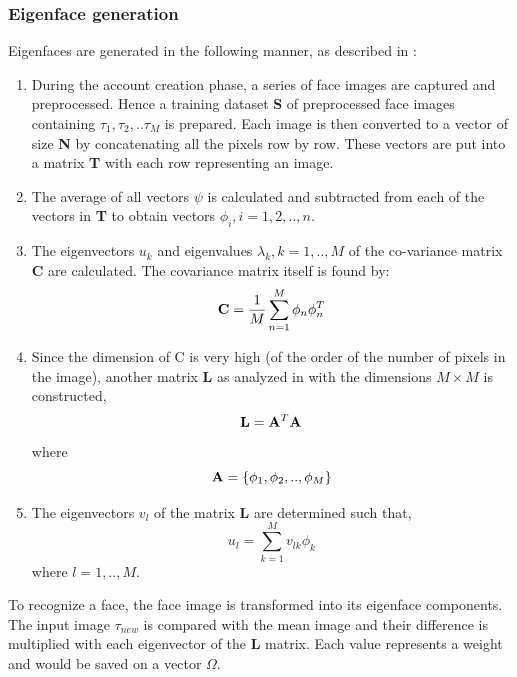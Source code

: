 \documentclass[%
        final,
        notitlepage,
        narroweqnarray,
        inline,
        ]{ieee}
\begin{document}
\subsubsection{ Eigenface generation }
Eigenfaces are generated in the following manner, as described in \cite{Turk91}:
\begin{enumerate}
	\item During the account creation phase, a series of face images are captured and preprocessed. Hence a training dataset {\bf S} of preprocessed face images containing $\tau_{1},\tau_{2},..\tau_{M}$ is prepared. Each image is then converted to a vector of size {\bf N} by concatenating all the pixels row by row. These vectors are put into a matrix {\bf T} with each row representing an image.
	\item The average of all vectors $\psi$ is calculated and subtracted from each of the vectors in {\bf T} to obtain vectors $\phi_{i}, i = 1,2,..,n$.
	\item The eigenvectors $u_{k}$ and eigenvalues $\lambda_{k}, k = 1,..,M$ of the co-variance matrix {\bf C} are calculated. The covariance matrix itself is found by: 
\begin{equation}
{\bf C} = \frac{1}{M}\sum_{n=1}^{M}\phi_{n}\phi_{n}^{T}
\end{equation}
	\item Since the dimension of C is very high (of the order of the number of pixels in the image), another matrix {\bf L} as analyzed in \cite{Turk91} with the dimensions $M\times M$ is constructed, 
	\begin{equation}
	{\bf L} = {\bf A}^{T}{\bf A}
	\end{equation}
	where 
	\begin{equation}
	{\bf A} = \{\phi_{1},\phi_{2},..,\phi_{M}\}
	\end{equation}
	\item The eigenvectors $v_{l}$ of the matrix {\bf L} are determined such that,
	\begin{equation}
	u_{l} = \sum_{k=1}^{M}v_{lk}\phi_{k} 
	\end{equation}
where $l = 1,..,M$.
\end{enumerate}

To recognize a face, the face image is transformed into its eigenface components. The input image $\tau_{new}$ is compared with the mean image and their difference is multiplied with each eigenvector of the {\bf L} matrix. Each value represents a weight and would be saved on a vector $\Omega$.
\end{document}
